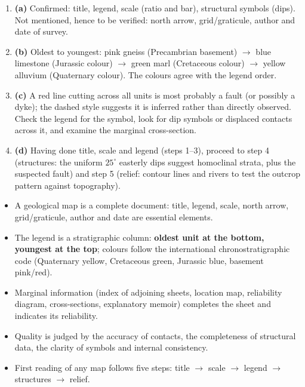 \documentclass[11pt]{article}
\newcommand{\cle}[1]{{\popxbold\color{popdark}#1}}
\begin{document}
\begin{corrige}[Exercise 1]
\begin{enumerate}
\item \textbf{(a)} Confirmed: title, legend, scale (ratio and bar), structural symbols (dips). Not mentioned, hence to be verified: north arrow, grid/graticule, author and date of survey.
\item \textbf{(b)} Oldest to youngest: pink gneiss (Precambrian basement) $\rightarrow$ blue limestone (Jurassic colour) $\rightarrow$ green marl (Cretaceous colour) $\rightarrow$ yellow alluvium (Quaternary colour). The colours agree with the legend order.
\item \textbf{(c)} A red line cutting across all units is most probably a fault (or possibly a dyke); the dashed style suggests it is inferred rather than directly observed. Check the legend for the symbol, look for dip symbols or displaced contacts across it, and examine the marginal cross-section.
\item \textbf{(d)} Having done title, scale and legend (steps 1--3), proceed to step 4 (structures: the uniform $25^{\circ}$ easterly dips suggest homoclinal strata, plus the suspected fault) and step 5 (relief: contour lines and rivers to test the outcrop pattern against topography).
\end{enumerate}
\end{corrige}

\begin{aretenir}
\begin{itemize}
\item A geological map is a complete document: \cle{title}, \cle{legend}, \cle{scale}, \cle{north arrow}, \cle{grid/graticule}, \cle{author} and \cle{date} are essential elements.
\item The legend is a stratigraphic column: \textbf{oldest unit at the bottom, youngest at the top}; colours follow the international chronostratigraphic code (Quaternary yellow, Cretaceous green, Jurassic blue, basement pink/red).
\item Marginal information (index of adjoining sheets, location map, reliability diagram, cross-sections, explanatory memoir) completes the sheet and indicates its reliability.
\item Quality is judged by the accuracy of contacts, the completeness of structural data, the clarity of symbols and internal consistency.
\item First reading of any map follows five steps: title $\rightarrow$ scale $\rightarrow$ legend $\rightarrow$ structures $\rightarrow$ relief.
\end{itemize}
\end{aretenir}
\end{document}
